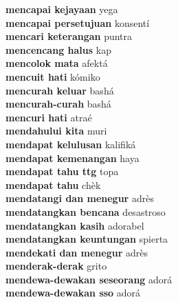 \textbf{ mencapai kejayaan  } yega \\
\textbf{ mencapai persetujuan  } konsentí \\
\textbf{ mencari keterangan  } puntra \\
\textbf{ mencencang halus  } kap \\
\textbf{ mencolok mata  } afektá \\
\textbf{ mencuit hati  } kómiko \\
\textbf{ mencurah keluar  } bashá \\
\textbf{ mencurah-curah  } bashá \\
\textbf{ mencuri hati  } atraé \\
\textbf{ mendahului kita  } muri \\
\textbf{ mendapat kelulusan  } kalifiká \\
\textbf{ mendapat kemenangan  } haya \\
\textbf{ mendapat tahu ttg  } topa \\
\textbf{ mendapat tahu  } chèk \\
\textbf{ mendatangi dan menegur  } adrès \\
\textbf{ mendatangkan bencana  } desastroso \\
\textbf{ mendatangkan kasih  } adorabel \\
\textbf{ mendatangkan keuntungan  } spierta \\
\textbf{ mendekati dan menegur  } adrès \\
\textbf{ menderak-derak  } grito \\
\textbf{ mendewa-dewakan seseorang  } adorá \\
\textbf{ mendewa-dewakan sso  } adorá \\
